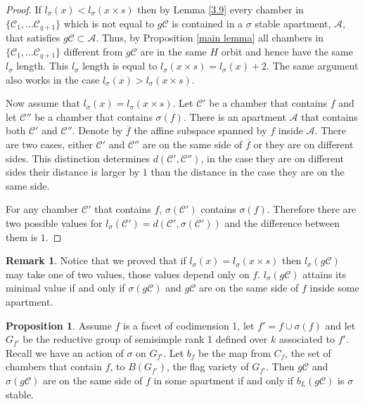 \documentclass[12pt]{article}
\newcommand{\A}{\mathcal{A}}
\newcommand{\C}{\mathcal{C}}
\newcommand{\<}{\langle}
\renewcommand{\>}{\rangle}
\theoremstyle{plain}
\theoremstyle{definition}
\newtheorem{prop}[theorem]{Proposition}
\newtheorem{Remark}[theorem]{Remark}
\begin{document}
\begin{proof}
If $l_\sigma(x)< l_\sigma(x\times s)$ then by Lemma \ref{3.9} every chamber in $\{\C_1,...\C_{q+1}\}$ which is not equal to $g\C$ is contained in a $\sigma$ stable apartment, $\A$, that satisfies $g\C\subset\A$. Thus, by Proposition \ref{main lemma} all chambers in $\{\C_1,...\C_{q+1}\}$ different from $g\C$ are in the same $H$ orbit and hence have the same $l_\sigma$ length. This $l_\sigma$ length is equal to $l_\sigma(x\times s)=l_\sigma(x)+2$. The same argument also works in the case $l_\sigma(x)> l_\sigma(x\times s)$.

Now assume that $l_\sigma(x)= l_\sigma(x\times s)$. Let $\C'$ be a chamber that contains $f$ and let $\C''$ be a chamber that contains $\sigma(f)$. There is an apartment $\A$ that contains both $\C'$ and $\C''$. Denote by $\overline{f}$ the affine subspace spanned by $f$ inside $\A$. There are two cases, either $\C'$ and $\C''$ are on the same side of $\overline{f}$ or they are on different sides. This distinction determines $d(\C',\C'')$, in the case they are on different sides their distance is larger by $1$ than the distance in the case they are on the same side.

For any chamber $\C'$ that contains $f$, $\sigma(\C')$ contains $\sigma(f)$. Therefore there are two possible values for $l_\sigma(\C')=d(\C',\sigma(\C'))$ and the difference between them is $1.$

\end{proof}

\begin{Remark}\label{r7.9}
    Notice that we proved that if $l_\sigma(x)= l_\sigma(x\times s)$ then $l_\sigma(g\C)$ may take one of two values, those values depend only on $f$. $l_\sigma(g\C)$ attains its minimal value if and only if $\sigma(g\C)$ and $g\C$ are on the same side of $f$ inside some apartment. 
\end{Remark}

\begin{prop}
    Assume $f$ is a facet of codimension 1, let $f'=f\cup \sigma(f)$ and let $G_{f'}$ be the reductive group of semisimple rank 1 defined over $k$ associated to $f'$. Recall we have an action of $\sigma$ on $G_{f'}$. Let $b_f$ be the map from $C_f$, the set of chambers that contain $f$, to $B(G_{f'})$, the flag variety of $G_{f'}$. Then $g\C$ and $\sigma(g\C)$ are on the same side of $f$ in some apartment if and only if $b_L(g\C)$ is $\sigma$ stable.
\end{prop}
\end{document}
